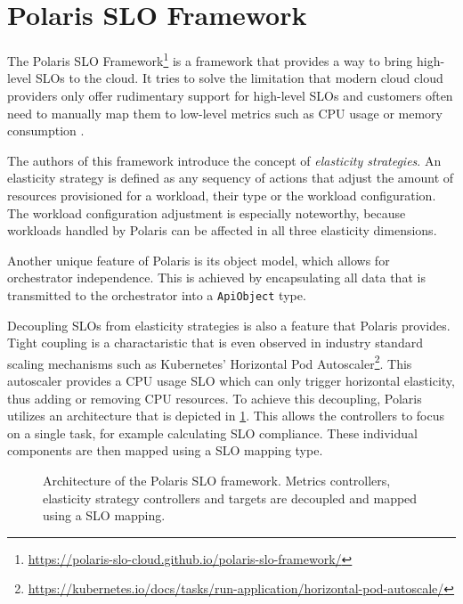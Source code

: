 \section{Polaris SLO Framework}
\label{sec:polaris}

The Polaris SLO Framework\footnote{\url{https://polaris-slo-cloud.github.io/polaris-slo-framework/}} is a framework that provides a way to bring high-level SLOs to the cloud. It tries to solve the limitation that modern cloud cloud providers only offer rudimentary support for high-level SLOs and customers often need to manually map them to low-level metrics such as CPU usage or memory consumption \cite{pusztaiSLOScriptNovel2021}.

The authors of this framework introduce the concept of \textit{elasticity strategies}. An elasticity strategy is defined as any sequency of actions that adjust the amount of resources provisioned for a workload, their type or the workload configuration. The workload configuration adjustment is especially noteworthy, because workloads handled by Polaris can be affected in all three elasticity dimensions.

Another unique feature of Polaris is its object model, which allows for orchestrator independence. This is achieved by encapsulating all data that is transmitted to the orchestrator into a \texttt{ApiObject} type.

Decoupling SLOs from elasticity strategies is also a feature that Polaris provides. Tight coupling is a charactaristic that is even observed in industry standard scaling mechanisms such as Kubernetes' Horizontal Pod Autoscaler\footnote{\raggedright\url{https://kubernetes.io/docs/tasks/run-application/horizontal-pod-autoscale/}}. This autoscaler provides a CPU usage SLO which can only trigger horizontal elasticity, thus adding or removing CPU resources. To achieve this decoupling, Polaris utilizes an architecture that is depicted in \cref{fig:polaris-architecture}. This allows the controllers to focus on a single task, for example calculating SLO compliance. These individual components are then mapped using a SLO mapping type.

\begin{figure}
    \centering
    \caption{Architecture of the Polaris SLO framework. Metrics controllers, elasticity strategy controllers and targets are decoupled and mapped using a SLO mapping.}
    \label{fig:polaris-architecture}
\end{figure}

